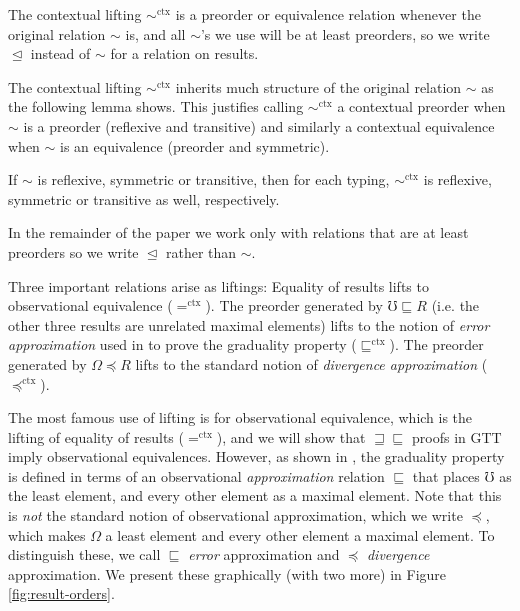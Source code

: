 \documentclass[acmsmall,nonacm]{acmart}
\newcommand{\ltdyn}{\sqsubseteq}
\newcommand{\gtdyn}{\sqsupseteq}
\newcommand{\equidyn}{\mathrel{\gtdyn\ltdyn}}
\newcommand{\apreorder}{\trianglelefteq}
\newcommand{\ctxize}[1]{\mathrel{{#1}^{\text{ctx}}}}
\newcommand{\err}{\mho}
\newcommand{\diverge}{\Omega}
\begin{document}
{\begin{shortonly}
The contextual lifting $\ctxize\sim$ is a preorder or equivalence
relation whenever the original relation $\sim$ is, and all $\sim$'s we
use will be at least preorders, so we write $\apreorder$ instead of
$\sim$ for a relation on results.
\end{shortonly}

\begin{longonly}
The contextual lifting $\ctxize\sim$ inherits much structure of the
original relation $\sim$ as the following lemma shows.
%
This justifies calling $\ctxize\sim$ a contextual preorder when $\sim$
is a preorder (reflexive and transitive) and similarly a contextual
equivalence when $\sim$ is an equivalence (preorder and symmetric).
%
\begin{definition}
  If $\sim$ is reflexive, symmetric or transitive, then for each
  typing, $\ctxize\sim$ is reflexive, symmetric or transitive as well,
  respectively.
\end{definition}
In the remainder of the paper we work only with relations that are at
least preorders so we write $\apreorder$ rather than $\sim$.
\end{longonly}

\begin{shortonly}
\noindent Three important relations arise as liftings: Equality of results lifts to observational equivalence
($\ctxize=$).  The preorder generated by $\err \ltdyn R$ (i.e. the other
three results are unrelated maximal elements) lifts to the notion of
\emph{error approximation} used in \citet{newahmed18} to prove the
graduality property ($\ctxize\ltdyn$).  The preorder generated by
$\diverge \preceq R$ lifts to the standard notion of \emph{divergence
  approximation} ($\ctxize\preceq$).
\end{shortonly}

\begin{longonly}
The most famous use of lifting is for observational equivalence,
which is the lifting of equality of results ($\ctxize=$), and we will show that
$\equidyn$ proofs in GTT imply observational equivalences.
%
However, as shown in \citet{newahmed18}, the graduality property is
defined in terms of an observational \emph{approximation} relation
$\ltdyn$ that places $\err$ as the least element, and every other
element as a maximal element.
%
Note that this is \emph{not} the standard notion of observational
approximation, which we write $\preceq$, which makes $\diverge$ a least
element and every other element a maximal element.
%
To distinguish these, we call $\ltdyn$ \emph{error} approximation and
$\preceq$ \emph{divergence} approximation.
%
We present these graphically (with two more) in Figure
\ref{fig:result-orders}.
\end{longonly}

}
\end{document}
